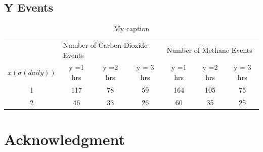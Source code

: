 \documentclass[numbook, envcountsect, envcountsame, envcountreset, runningheads, twocolumn]{svjour3}
\begin{document}
\begin{appendices}
		\section{Y Events}
			\begin{table}[]
				\centering
				\caption{My caption}
				\label{tab:eventcount}
				\begin{tabular}{c|c|c|c|c|c|c}
					& \multicolumn{3}{l|}{Number of Carbon Dioxide Events} & \multicolumn{3}{l|}{Number of Methane Events} \\ \cline{2-7} 
					$x\left(\sigma\left(daily\right)\right)$ & y =1 hrs        & y =2 hrs        & y = 3 hrs        & y =1 hrs      & y =2 hrs      & y = 3 hrs     \\ \hline
					1           & 117             & 78              & 59               & 164           & 105           & 75            \\
					2           & 46              & {\color{red}33}              & 26               & 60            & {\color{red}35}            & 25           
				\end{tabular}
			\end{table}
	\end{appendices}
	
	\section*{Acknowledgment}

	
\end{document}
